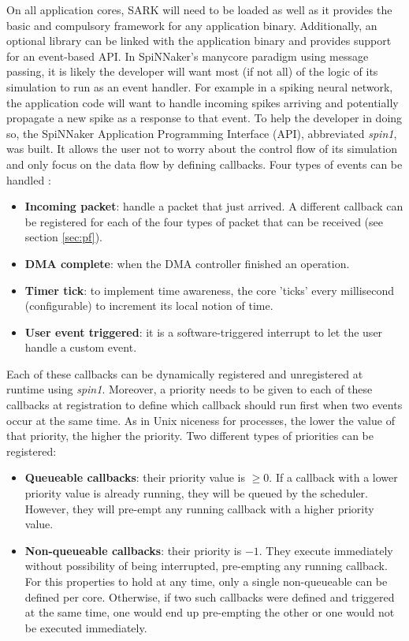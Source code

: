 On all application cores, SARK will need to be loaded as well as it provides the basic and compulsory framework for any application binary. Additionally, an optional library can be linked with the application binary and provides support for an event-based API. In SpiNNaker's manycore paradigm using message passing, it is likely the developer will want most (if not all) of the logic of its simulation to run as an event handler. For example in a spiking neural network, the application code will want to handle incoming spikes arriving and potentially propagate a new spike as a response to that event. To help the developer in doing so, the SpiNNaker Application Programming Interface (API), abbreviated \textit{spin1}, was built. It allows the user not to worry about the control flow of its simulation and only focus on the data flow by defining callbacks. Four types of events can be handled \cite{spinnaker}: 

\begin{itemize}
\item \textbf{Incoming packet}: handle a packet that just arrived. A different callback can be registered for each of the four types of packet that can be received (see section \ref{sec:pf}).

\item \textbf{DMA complete}: when the DMA controller finished an operation.

\item \textbf{Timer tick}: to implement time awareness, the core 'ticks' every millisecond (configurable) to increment its local notion of time.

\item \textbf{User event triggered}: it is a software-triggered interrupt to let the user handle a custom event.
\end{itemize}

Each of these callbacks can be dynamically registered and unregistered at runtime using \textit{spin1}. Moreover, a priority needs to be given to each of these callbacks at registration to define which callback should run first when two events occur at the same time. As in Unix niceness for processes, the lower the value of that priority, the higher the priority. Two different types of priorities can be registered:

\begin{itemize}
\item \textbf{Queueable callbacks}: their priority value is $\ge 0$. If a callback with a lower priority value is already running, they will be queued by the scheduler. However, they will pre-empt any running callback with a higher priority value.

\item \textbf{Non-queueable callbacks}: their priority is $-1$. They execute immediately without possibility of being interrupted, pre-empting any running callback. For this properties to hold at any time, only a single non-queueable can be defined per core. Otherwise, if two such callbacks were defined and triggered at the same time, one would end up pre-empting the other or one would not be executed immediately.
\end{itemize}

